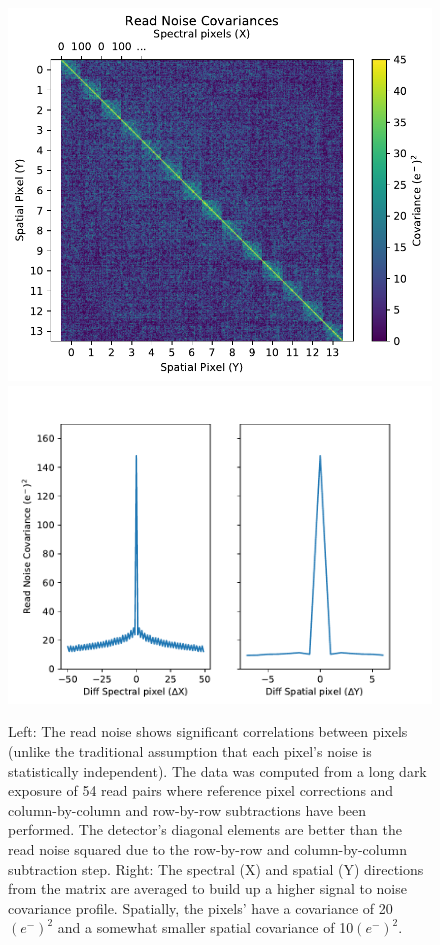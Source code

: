\documentclass{aastex62}
\begin{document}
%
\begin{figure}[!hbtp]
\centering
\includegraphics[width=.49\columnwidth]{spec_spatial_cov.pdf}
\includegraphics[width=.49\columnwidth]{cross_sections_cov.pdf}
\caption{Left: The read noise shows significant correlations between pixels (unlike the traditional assumption that each pixel's noise is statistically independent).
The data was computed from a long dark exposure of 54 read pairs where reference pixel corrections and column-by-column and row-by-row subtractions have been performed.
The detector's diagonal elements are better than the read noise squared due to the row-by-row and column-by-column subtraction step.
Right: The spectral (X) and spatial (Y) directions from the matrix are averaged to build up a higher signal to noise covariance profile.
Spatially, the pixels' have a covariance of 20~$(e^-)^2$ and a somewhat smaller spatial covariance of 10$(e^-)^2$.}\label{fig:covSpecSpatial}
\end{figure}
\end{document}
